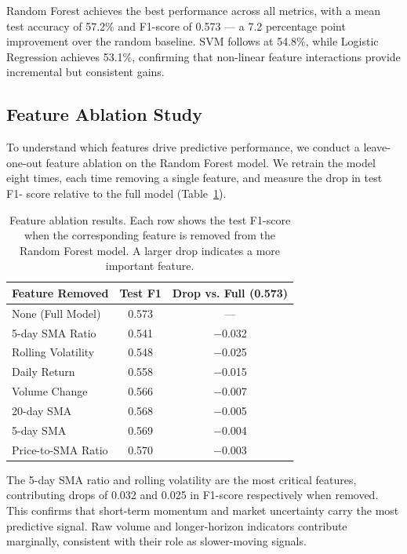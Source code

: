 \documentclass{article}
\begin{document}
Random Forest achieves the best performance across all metrics, with a mean test
accuracy of 57.2\% and F1-score of 0.573 --- a 7.2 percentage point improvement
over the random baseline. SVM follows at 54.8\%, while Logistic Regression
achieves 53.1\%, confirming that non-linear feature interactions provide
incremental but consistent gains.

\subsection{Feature Ablation Study}

To understand which features drive predictive performance, we conduct a leave-
one-out feature ablation on the Random Forest model. We retrain the model eight
times, each time removing a single feature, and measure the drop in test F1-
score relative to the full model (Table~\ref{tab:ablation}).

\begin{table}[ht]
\centering
\caption{Feature ablation results. Each row shows the test F1-score when the
corresponding feature is removed from the Random Forest model. A larger drop
indicates a more important feature.}
\label{tab:ablation}
\begin{tabular}{lcc}
\toprule
\textbf{Feature Removed} & \textbf{Test F1} & \textbf{Drop vs. Full (0.573)} \\
\midrule
None (Full Model)       & 0.573 & --- \\
5-day SMA Ratio         & 0.541 & $-$0.032 \\
Rolling Volatility      & 0.548 & $-$0.025 \\
Daily Return            & 0.558 & $-$0.015 \\
Volume Change           & 0.566 & $-$0.007 \\
20-day SMA              & 0.568 & $-$0.005 \\
5-day SMA               & 0.569 & $-$0.004 \\
Price-to-SMA Ratio      & 0.570 & $-$0.003 \\
\bottomrule
\end{tabular}
\end{table}

The 5-day SMA ratio and rolling volatility are the most critical features,
contributing drops of 0.032 and 0.025 in F1-score respectively when removed.
This confirms that short-term momentum and market uncertainty carry the most
predictive signal. Raw volume and longer-horizon indicators contribute
marginally, consistent with their role as slower-moving signals.
\end{document}
